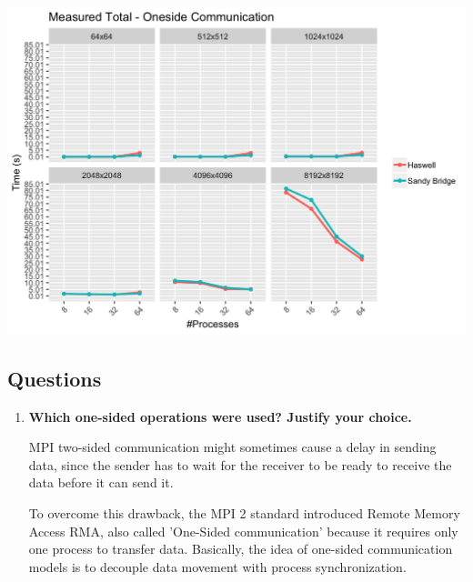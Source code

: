 \documentclass[10pt, letterpaper, twoside]{article}
\begin{document}
\begin{titlepage}
\begin{enumerate}
\includegraphics[scale = 0.18]{OS_Measured-Total_InputSize.png}
\end{enumerate} 

\subsection{Questions}

\begin{enumerate}
\item\textbf{Which one-sided operations were used? Justify your choice.}

MPI two-sided communication might sometimes cause a delay in sending data, since the sender has to wait for the receiver to be ready to receive the data before it can send it. 

To overcome this drawback, the MPI 2 standard introduced Remote Memory Access RMA, also called 'One-Sided communication' because it requires only one process to transfer data. Basically, the idea of one-sided communication models is to decouple data movement with process synchronization.


\end{enumerate}
\end{titlepage}
\end{document}
